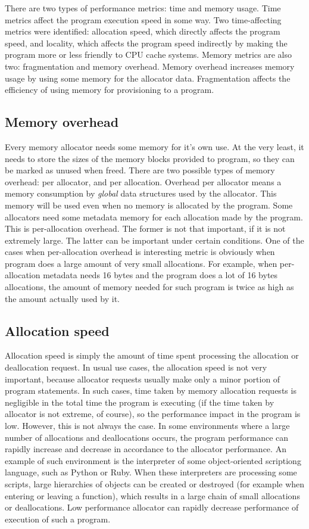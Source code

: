 There are two types of performance metrics: time and memory usage. Time metrics affect the program execution speed in some way. Two time-affecting metrics were identified: allocation speed, which directly affects the program speed, and locality, which affects the program speed indirectly by making the program more or less friendly to CPU cache systems. Memory metrics are also two: fragmentation and memory overhead. Memory overhead increases memory usage by using some memory for the allocator data. Fragmentation affects the efficiency of using memory for provisioning to a program.

\subsection{Memory overhead}
Every memory allocator needs some memory for it's own use. At the very least, it needs to store the sizes of the memory blocks provided to program, so they can be marked as unused when freed. There are two possible types of memory overhead: per allocator, and per allocation. Overhead per allocator means a memory consumption by {\em global} data structures used by the allocator. This memory will be used even when no memory is allocated by the program. Some allocators need some metadata memory for each allocation made by the program. This is per-allocation overhead. The former is not that important, if it is not extremely large. The latter can be important under certain conditions. One of the cases when per-allocation overhead is interesting metric is obviously when program does a large amount of very small allocations. For example, when per-allocation metadata needs 16 bytes and the program does a lot of 16 bytes allocations, the amount of memory needed for such program is twice as high as the amount actually used by it.
\subsection{Allocation speed}
Allocation speed is simply the amount of time spent processing the allocation or deallocation request. In usual use cases, the allocation speed is not very important, because allocator requests usually make only a minor portion of program statements. In such cases, time taken by memory allocation requests is negligible in the total time the program is executing (if the time taken by allocator is not extreme, of course), so the performance impact in the program is low. However, this is not always the case. In some environments where a large number of allocations and deallocations occurs, the program performance can rapidly increase and decrease in accordance to the allocator performance. An example of such environment is the interpreter of some object-oriented scriptiong language, such as Python or Ruby. When these interpreters are processing some scripts, large hierarchies of objects can be created or destroyed (for example when entering or leaving a function), which results in a large chain of small allocations or deallocations. Low performance allocator can rapidly decrease performance of execution of such a program.
